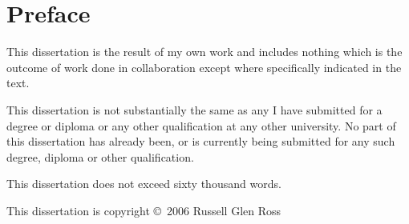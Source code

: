 
\chapter*{Preface}

{
\parskip 10pt

\noindent This dissertation is the result of my own work and includes nothing which is the outcome of work done in collaboration except where specifically indicated in the text.

\noindent This dissertation is not substantially the same as any I have submitted for a degree or diploma or any other qualification at any other university. No part of this dissertation has already been, or is currently being submitted for any such degree, diploma or other qualification.

\noindent This dissertation does not exceed sixty thousand words.
}
\vfill

\noindent This dissertation is copyright \copyright~2006 Russell Glen Ross